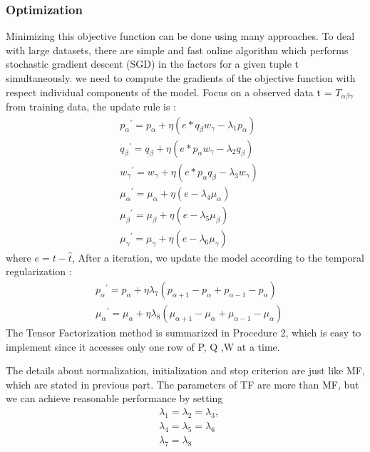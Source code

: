 \subsubsection{Optimization}
Minimizing this objective function can be done using many approaches.
To deal with large datasets, there are simple and fast online algorithm which performs stochastic gradient descent (SGD) in the factors for a given tuple t simultaneously.
we need to compute the gradients of the objective function with respect individual components of the model.
Focus on a observed data t = $T_{\alpha\beta\gamma } $ from training data, the update rule is :
\begin{equation*}
\begin{aligned}
&{p_\alpha}^\prime={p_\alpha}+\eta(e*q_\beta w_\gamma - \lambda_1 p_\alpha)
\\&{q_\beta}^\prime={q_\beta}+\eta(e*p_\alpha w_\gamma - \lambda_2 q_\beta)
\\&{w_\gamma}^\prime={w_\gamma}+\eta(e*p_\alpha q_\beta - \lambda_3 w_\gamma)
\\&{\mu_\alpha}^\prime=\mu_\alpha+\eta(e-\lambda_4\mu_\alpha)
\\&{\mu_\beta}^\prime=\mu_\beta+\eta(e-\lambda_5\mu_\beta)
\\&{\mu_\gamma}^\prime=\mu_\gamma+\eta(e-\lambda_6\mu_\gamma)
\end{aligned}
\end{equation*}
where $e=t-\hat{t}$, After a iteration, we update the model according to the temporal regularization :
\begin{equation*}
\begin{aligned}
&{p_\alpha}^\prime={p_\alpha}+\eta\lambda_7(p_{\alpha+1}-p_\alpha+p_{\alpha-1}-p_\alpha)
\\&{\mu_\alpha}^\prime=\mu_\alpha+\eta\lambda_8(\mu_{\alpha+1}-\mu_\alpha+\mu_{\alpha-1}-\mu_\alpha)
\end{aligned}
\end{equation*}
The Tensor Factorization method is summarized in Procedure 2, which is easy to implement since it accesses only one row of P, Q ,W at a time.

The details about normalization, initialization and stop criterion are just like MF, which are stated in previous part.
The parameters of TF are more than MF, but we can achieve reasonable performance by setting
\begin{equation*}
\begin{aligned}
& \lambda_1=\lambda_2=\lambda_3,\\
& \lambda_4=\lambda_5=\lambda_6\\
&\lambda_7=\lambda_8\\
\end{aligned}
\end{equation*}
